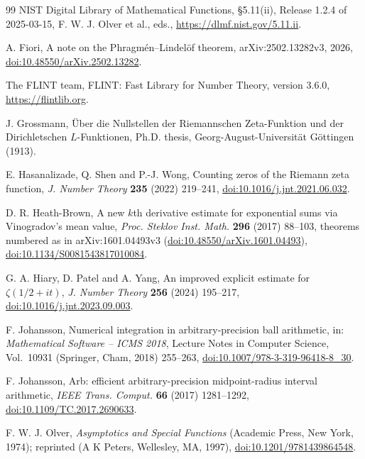 \documentclass[11pt,reqno]{amsart}
\numberwithin{equation}{section}
\theoremstyle{definition}
\theoremstyle{remark}
\begin{document}
\begin{thebibliography}{99}
 NIST Digital Library of Mathematical Functions, \S5.11(ii), Release 1.2.4 of 2025-03-15, F. W. J. Olver et al., eds., \url{https://dlmf.nist.gov/5.11.ii}.

 A. Fiori, A note on the Phragm\'en--Lindel\"of theorem, arXiv:2502.13282v3, 2026, \href{https://doi.org/10.48550/arXiv.2502.13282}{doi:10.48550/arXiv.2502.13282}.

 The FLINT team, FLINT: Fast Library for Number Theory, version 3.6.0, \url{https://flintlib.org}.

 J. Grossmann, \"Uber die Nullstellen der Riemannschen Zeta-Funktion und der Dirichletschen $L$-Funktionen, Ph.D. thesis, Georg-August-Universit\"at G\"ottingen (1913).

 E. Hasanalizade, Q. Shen and P.-J. Wong, Counting zeros of the Riemann zeta function, \textit{J. Number Theory} \textbf{235} (2022) 219--241, \href{https://doi.org/10.1016/j.jnt.2021.06.032}{doi:10.1016/j.jnt.2021.06.032}.

 D. R. Heath-Brown, A new $k$th derivative estimate for exponential sums via Vinogradov's mean value, \textit{Proc. Steklov Inst. Math.} \textbf{296} (2017) 88--103, theorems numbered as in arXiv:1601.04493v3 (\href{https://doi.org/10.48550/arXiv.1601.04493}{doi:10.48550/arXiv.1601.04493}), \href{https://doi.org/10.1134/S0081543817010084}{doi:10.1134/S0081543817010084}.

 G. A. Hiary, D. Patel and A. Yang, An improved explicit estimate for $\zeta(1/2+it)$, \textit{J. Number Theory} \textbf{256} (2024) 195--217, \href{https://doi.org/10.1016/j.jnt.2023.09.003}{doi:10.1016/j.jnt.2023.09.003}.

 F. Johansson, Numerical integration in arbitrary-precision ball arithmetic, in: \textit{Mathematical Software -- ICMS 2018}, Lecture Notes in Computer Science, Vol.~10931 (Springer, Cham, 2018) 255--263, \href{https://doi.org/10.1007/978-3-319-96418-8_30}{doi:10.1007/978-3-319-96418-8\_30}.

 F. Johansson, Arb: efficient arbitrary-precision midpoint-radius interval arithmetic, \textit{IEEE Trans. Comput.} \textbf{66} (2017) 1281--1292, \href{https://doi.org/10.1109/TC.2017.2690633}{doi:10.1109/TC.2017.2690633}.

 F. W. J. Olver, \textit{Asymptotics and Special Functions} (Academic Press, New York, 1974); reprinted (A K Peters, Wellesley, MA, 1997), \href{https://doi.org/10.1201/9781439864548}{doi:10.1201/9781439864548}.


\end{thebibliography}
\end{document}
